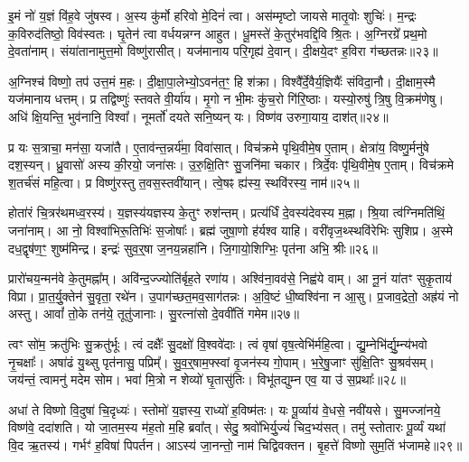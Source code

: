 इ॒मं नो॑ य॒ज्ञं वि॑ह॒वे जु॑षस्व।
अ॒स्य कु॑र्मो हरिवो मे॒दिनं॑ त्वा।
अस॑म्मृष्टो जायसे मातृ॒वोः शुचिः॑।
म॒न्द्रः क॒विरुद॑तिष्ठो॒ विव॑स्वतः।
घृ॒तेन॑ त्वा वर्धयन्नग्न आहुत।
धू॒मस्ते॑ के॒तुर॑भवद्दि॒वि श्रि॒तः।
अ॒ग्निरग्रे᳚ प्रथ॒मो दे॒वता॑नाम्।
संया॑तानामुत्त॒मो विष्णु॑रासीत्।
यज॑मानाय परि॒गृह्य॑ दे॒वान्।
दी॒क्षये॒दꣳ ह॒विरा ग॑च्छतन्नः॥२३॥

अ॒ग्निश्च॑ विष्णो॒ तप॑ उत्त॒मं म॒हः।
दी॒क्षा॒पा॒लेभ्यो॒\-ऽवन॑त॒ꣳ॒ हि श॑क्रा।
विश्वै᳚र्दे॒वैर्य॒ज्ञियैः᳚ संविदा॒नौ।
दी॒क्षाम॒स्मै यज॑मानाय धत्तम्।
प्र तद्विष्णुः॑ स्तवते वी॒र्या॑य।
मृ॒गो न भी॒मः कु॑च॒रो गि॑रि॒ष्ठाः।
यस्यो॒रुषु॑ त्रि॒षु वि॒क्रम॑णेषु।
अधि॑ क्षि॒यन्ति॒ भुव॑नानि॒ विश्वा᳚।
नूमर्तो॑ दयते सनि॒ष्यन् यः।
विष्ण॑व उरुगा॒याय॒ दाश॑त्॥२४॥

प्र यः स॒त्राचा॒ मन॑सा॒ यजा॑तै।
ए॒ताव॑न्त॒न्नर्य॑मा॒ विवा॑सात्।
विच॑क्रमे पृथि॒वीमे॒ष ए॒ताम्।
क्षेत्रा॑य॒ विष्णु॒र्मनु॑षे दश॒स्यन्।
ध्रु॒वासो॑ अस्य की॒रयो॒ जना॑सः।
उ॒रु॒क्षि॒तिꣳ सु॒जनि॑मा चकार।
त्रिर्दे॒वः पृ॑थि॒वीमे॒ष ए॒ताम्।
विच॑क्रमे श॒तर्च॑सं महि॒त्वा।
प्र विष्णु॑रस्तु त॒वस॒स्तवी॑यान्।
त्वे॒षꣴ ह्य॑स्य॒ स्थवि॑रस्य॒ नाम॑॥२५॥

होता॑रं चि॒त्रर॑थमध्व॒रस्य॑।
य॒ज्ञस्य॑यज्ञस्य के॒तुꣳ रुश॑न्तम्।
प्रत्य॑र्धिं दे॒वस्य॑देवस्य म॒ह्ना।
श्रि॒या त्व॑ग्निमति॑थिं॒ जना॑नाम्।
आ नो॒ विश्वा॑भिरू॒तिभिः॑ स॒जोषाः᳚।
ब्रह्म॑ जुषा॒णो ह॑र्यश्व याहि।
वरी॑वृज॒थ्स्थवि॑रेभिः सुशिप्र।
अ॒स्मे दध॒द्वृष॑ण॒ꣳ॒ शुष्म॑मिन्द्र।
इन्द्रः॑ सुव॒र्॒षा ज॒नय॒न्नहा॑नि।
जि॒गायो॒शिग्भिः॒ पृत॑ना अभि॒ श्रीः॥२६॥

प्रारो॑चय॒न्मन॑वे के॒तुमह्ना᳚म्।
अवि॑न्द॒ज्ज्योति॑र्बृह॒ते रणा॑य।
अश्वि॑ना॒वव॑से॒ निह्व॑ये वाम्।
आ नू॒नं या॑तꣳ सुकृ॒ताय॑ विप्रा।
प्रा॒त॒र्यु॒क्तेन॑ सु॒वृता॒ रथे॑न।
उ॒पाग॑च्छत॒मव॒साग॑तन्नः।
अ॒वि॒ष्टं धी॒ष्वश्वि॑ना न आ॒सु।
प्र॒जाव॒द्रेतो॒ अह्र॑यं नो अस्तु।
आवां᳚ तो॒के तन॑ये॒ तूतु॑जानाः।
सु॒रत्ना॑सो दे॒ववी॑तिं गमेम॥२७॥

त्वꣳ सो॑म॒ क्रतु॑भिः सु॒क्रतु॑र्भूः।
त्वं दक्षैः᳚ सु॒दक्षो॑ वि॒श्ववे॑दाः।
त्वं वृषा॑ वृष॒त्वेभि॑र्महि॒त्वा।
द्यु॒म्नेभि॑र्द्यु॒म्न्य॑भवो नृ॒चक्षाः᳚।
अषा॑ढं यु॒थ्सु पृत॑नासु॒ पप्रिम्᳚।
सु॒व॒र्॒षाम॒फ्स्वां वृ॒जन॑स्य गो॒पाम्।
भ॒रे॒षु॒जाꣳ सु॑क्षि॒तिꣳ सु॒श्रव॑सम्।
जय॑न्तं॒ त्वामनु॑ मदेम सोम।
भवा॑ मि॒त्रो न शेव्यो॑ घृ॒तासु॑तिः।
विभू॑तद्युम्न एव॒ या उ॑ स॒प्रथाः᳚॥२८॥

अधा॑ ते विष्णो वि॒दुषा॑ चि॒दृध्यः॑।
स्तोमो॑ य॒ज्ञस्य॒ राध्यो॑ ह॒विष्म॑तः।
यः पू॒र्व्याय॑ वे॒धसे॒ नवी॑यसे।
सु॒मज्जा॑नये॒ विष्ण॑वे॒ ददा॑शति।
यो जा॒तम॒स्य म॑ह॒तो म॒हि ब्रवा᳚त्।
सेदु॒ श्रवो॑भिर्यु॒ज्यं॑         चिद॒भ्य॑सत्।
तमु॑ स्तोतारः पू॒र्व्यं यथा॑ वि॒द ऋ॒तस्य॑।
गर्भꣳ॑ ह॒विषा॑ पिपर्तन।
आऽस्य॑ जा॒नन्तो॒ नाम॑ चिद्विवक्तन।
बृ॒हत्ते॑ विष्णो सुम॒तिं भ॑जामहे॥२९॥

